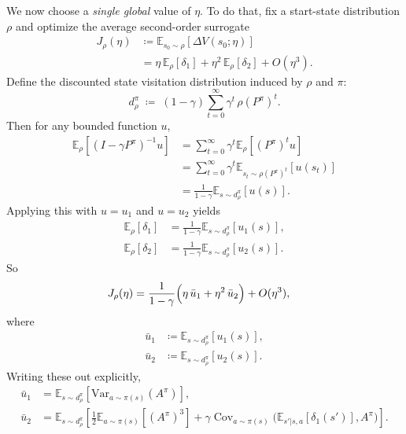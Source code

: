 \documentclass[11pt]{article}
\theoremstyle{definition}
\theoremstyle{remark}
\newcommand{\Var}{\mathrm{Var}}
\newcommand{\E}{\mathbb{E}}
\DeclareMathOperator{\Cov}{Cov}
\begin{document}
We now choose a \emph{single global} value of $\eta$. To do that, fix a start-state distribution $\rho$ and optimize the average second-order surrogate
\begin{align}
  J_\rho(\eta)
  &\coloneqq
  \E_{s_0\sim\rho}[\Delta V(s_0;\eta)] \nonumber\\
  &=
  \eta\,\E_\rho[\delta_1]
  + \eta^2\,\E_\rho[\delta_2]
  + O(\eta^3).
\end{align}
Define the discounted state visitation distribution induced by $\rho$ and $\pi$:
\begin{equation}
  d_\rho^\pi
  \;\coloneqq\;
  (1-\gamma)\sum_{t=0}^\infty \gamma^t\,\rho(P^\pi)^t.
\end{equation}
Then for any bounded function $u$,
\begin{align}
  \E_\rho[(I-\gamma P^\pi)^{-1}u]
  &= \sum_{t=0}^\infty \gamma^t \E_\rho[(P^\pi)^t u] \nonumber\\
  &= \sum_{t=0}^\infty \gamma^t \E_{s_t\sim \rho(P^\pi)^t}[u(s_t)] \nonumber\\
  &= \frac{1}{1-\gamma}\E_{s\sim d_\rho^\pi}[u(s)].
\end{align}
Applying this with $u=u_1$ and $u=u_2$ yields
\begin{align}
  \E_\rho[\delta_1]
  &= \frac{1}{1-\gamma}\E_{s\sim d_\rho^\pi}[u_1(s)], \\
  \E_\rho[\delta_2]
  &= \frac{1}{1-\gamma}\E_{s\sim d_\rho^\pi}[u_2(s)].
\end{align}
So
\begin{align}
  J_\rho(\eta)
  &=
  \frac{1}{1-\gamma}
  \Bigl(
    \eta\,\bar u_1 + \eta^2\,\bar u_2
  \Bigr)
  + O(\eta^3),
\end{align}
where
\begin{align}
  \bar u_1 &\coloneqq \E_{s\sim d_\rho^\pi}[u_1(s)], \\
  \bar u_2 &\coloneqq \E_{s\sim d_\rho^\pi}[u_2(s)].
\end{align}
Writing these out explicitly,
\begin{align}
  \bar u_1
  &=
  \E_{s\sim d_\rho^\pi}\!\left[\Var_{a\sim\pi(s)}(A^\pi)\right], \\
  \bar u_2
  &=
  \E_{s\sim d_\rho^\pi}\!\left[
    \frac12 \E_{a\sim\pi(s)}[(A^\pi)^3]
    + \gamma \Cov_{a\sim\pi(s)}\!\bigl(\E_{s'|s,a}[\delta_1(s')],A^\pi\bigr)
  \right].
\end{align}
\end{document}

